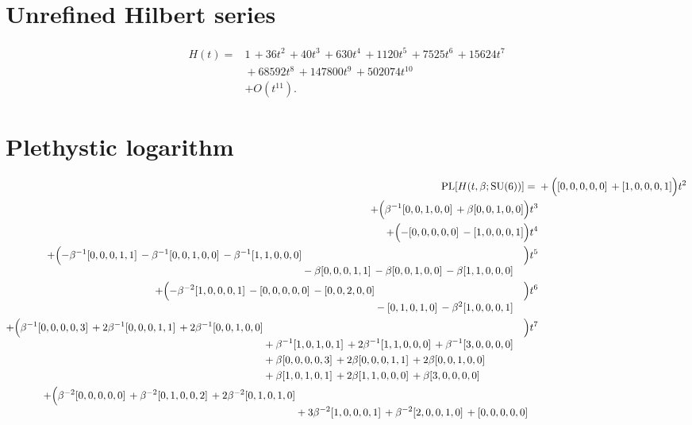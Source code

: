 \documentclass[10pt]{article}
\begin{document}
\section{Unrefined Hilbert series}
\[
\begin{aligned}
H(t) ={}& 1\,+36t^{2}\,+40t^{3}\,+630t^{4}\,+1120t^{5}\,+7525t^{6}\,+15624t^{7} \\
  &{}+68592t^{8}\,+147800t^{9}\,+502074t^{10} \\
  &+ O(t^{11}).
\end{aligned}
\]

\section{Plethystic logarithm}
\[
\begin{aligned}
\operatorname{PL}[H(t,\beta;\mathrm{SU}(6))] ={}&
  + \Bigl([0,0,0,0,0]\,+[1,0,0,0,1]\Bigr)t^{2} \\
  + \Bigl(\beta^{-1}[0,0,1,0,0]\,+\beta[0,0,1,0,0]\Bigr)t^{3} \\
  + \Bigl(-[0,0,0,0,0]\,-[1,0,0,0,1]\Bigr)t^{4} \\
  + \Bigl(\begin{aligned}[t]-\beta^{-1}[0,0,0,1,1]\,-\beta^{-1}[0,0,1,0,0]\,-\beta^{-1}[1,1,0,0,0] \\
  &{}-\beta[0,0,0,1,1]\,-\beta[0,0,1,0,0]\,-\beta[1,1,0,0,0]\end{aligned}\Bigr)t^{5} \\
  + \Bigl(\begin{aligned}[t]-\beta^{-2}[1,0,0,0,1]\,-[0,0,0,0,0]\,-[0,0,2,0,0] \\
  &{}-[0,1,0,1,0]\,-\beta^{2}[1,0,0,0,1]\end{aligned}\Bigr)t^{6} \\
  + \Bigl(\begin{aligned}[t]\beta^{-1}[0,0,0,0,3]\,+2\beta^{-1}[0,0,0,1,1]\,+2\beta^{-1}[0,0,1,0,0] \\
  &{}+\beta^{-1}[1,0,1,0,1]\,+2\beta^{-1}[1,1,0,0,0]\,+\beta^{-1}[3,0,0,0,0] \\
  &{}+\beta[0,0,0,0,3]\,+2\beta[0,0,0,1,1]\,+2\beta[0,0,1,0,0] \\
  &{}+\beta[1,0,1,0,1]\,+2\beta[1,1,0,0,0]\,+\beta[3,0,0,0,0]\end{aligned}\Bigr)t^{7} \\
  + \Bigl(\begin{aligned}[t]\beta^{-2}[0,0,0,0,0]\,+\beta^{-2}[0,1,0,0,2]\,+2\beta^{-2}[0,1,0,1,0] \\
  &{}+3\beta^{-2}[1,0,0,0,1]\,+\beta^{-2}[2,0,0,1,0]\,+[0,0,0,0,0] \\

\end{aligned}
\end{aligned}\]
\end{document}

